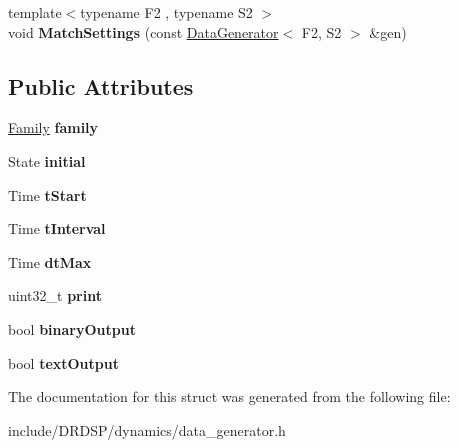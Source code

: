 \begin{DoxyCompactItemize}
\item 
\hypertarget{struct_d_r_d_s_p_1_1_data_generator_a617736ea54c49cca045295fd584f575b}{{\footnotesize template$<$typename F2 , typename S2 $>$ }\\void {\bfseries Match\-Settings} (const \hyperlink{struct_d_r_d_s_p_1_1_data_generator}{Data\-Generator}$<$ F2, S2 $>$ \&gen)}\label{struct_d_r_d_s_p_1_1_data_generator_a617736ea54c49cca045295fd584f575b}

\end{DoxyCompactItemize}
\subsection*{Public Attributes}
\begin{DoxyCompactItemize}
\item 
\hypertarget{struct_d_r_d_s_p_1_1_data_generator_a1c66f08a6c5e15f721dfd5cf05de44cc}{\hyperlink{struct_d_r_d_s_p_1_1_family}{Family} {\bfseries family}}\label{struct_d_r_d_s_p_1_1_data_generator_a1c66f08a6c5e15f721dfd5cf05de44cc}

\item 
\hypertarget{struct_d_r_d_s_p_1_1_data_generator_a452f2752ccfcbe601ab4f06c09971cc5}{State {\bfseries initial}}\label{struct_d_r_d_s_p_1_1_data_generator_a452f2752ccfcbe601ab4f06c09971cc5}

\item 
\hypertarget{struct_d_r_d_s_p_1_1_data_generator_a31210577ff8d44eb4bdebfdbf7204260}{Time {\bfseries t\-Start}}\label{struct_d_r_d_s_p_1_1_data_generator_a31210577ff8d44eb4bdebfdbf7204260}

\item 
\hypertarget{struct_d_r_d_s_p_1_1_data_generator_a721cb3f6a161a1576ebbf63386ec6f87}{Time {\bfseries t\-Interval}}\label{struct_d_r_d_s_p_1_1_data_generator_a721cb3f6a161a1576ebbf63386ec6f87}

\item 
\hypertarget{struct_d_r_d_s_p_1_1_data_generator_ad0930651c1f8a0b7806809777119d735}{Time {\bfseries dt\-Max}}\label{struct_d_r_d_s_p_1_1_data_generator_ad0930651c1f8a0b7806809777119d735}

\item 
\hypertarget{struct_d_r_d_s_p_1_1_data_generator_a8b22578311e44bfa08a8c40ad70bd337}{uint32\-\_\-t {\bfseries print}}\label{struct_d_r_d_s_p_1_1_data_generator_a8b22578311e44bfa08a8c40ad70bd337}

\item 
\hypertarget{struct_d_r_d_s_p_1_1_data_generator_a38c700048ca17d6cf0396bd48fef23bd}{bool {\bfseries binary\-Output}}\label{struct_d_r_d_s_p_1_1_data_generator_a38c700048ca17d6cf0396bd48fef23bd}

\item 
\hypertarget{struct_d_r_d_s_p_1_1_data_generator_aa1309d8accdd86f65bc8157362cda342}{bool {\bfseries text\-Output}}\label{struct_d_r_d_s_p_1_1_data_generator_aa1309d8accdd86f65bc8157362cda342}

\end{DoxyCompactItemize}


The documentation for this struct was generated from the following file\-:\begin{DoxyCompactItemize}
\item 
include/\-D\-R\-D\-S\-P/dynamics/data\-\_\-generator.\-h\end{DoxyCompactItemize}
